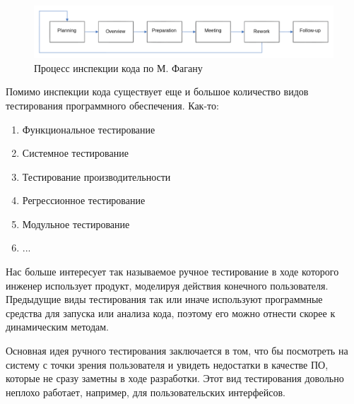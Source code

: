 \begin{figure}[H]
  \centering
  \includegraphics[width=\textwidth]{img/fagan.png}
  \caption{Процесс инспекции кода по М. Фагану}
\end{figure}

Помимо инспекции кода существует еще и большое количество видов тестирования программного обеспечения. Как-то:

\begin{enumerate}
  \item Функциональное тестирование
  \item Системное тестирование
  \item Тестирование производительности
  \item Регрессионное тестирование
  \item Модульное тестирование
  \item ...
\end{enumerate}

Нас больше интересует так называемое ручное тестирование в ходе которого инженер использует продукт, моделируя действия конечного пользователя. Предыдущие виды тестирования так или иначе используют программные средства для запуска или анализа кода, поэтому его можно отнести скорее к динамическим методам.

Основная идея ручного тестирования заключается в том, что бы посмотреть на систему с точки зрения пользователя и увидеть недостатки в качестве ПО, которые не сразу заметны в ходе разработки. Этот вид тестирования довольно неплохо работает, например, для пользовательских интерфейсов. 
